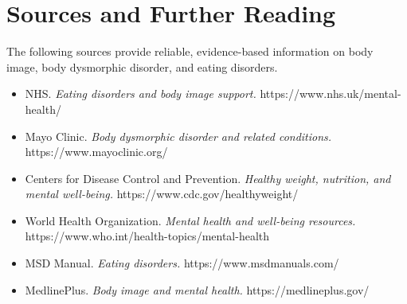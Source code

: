 \section*{Sources and Further Reading}
The following sources provide reliable, evidence-based information on body image, body dysmorphic disorder, and eating disorders.
\begin{itemize}
    \item NHS. \textit{Eating disorders and body image support.} https://www.nhs.uk/mental-health/
    \item Mayo Clinic. \textit{Body dysmorphic disorder and related conditions.} https://www.mayoclinic.org/
    \item Centers for Disease Control and Prevention. \textit{Healthy weight, nutrition, and mental well-being.} https://www.cdc.gov/healthyweight/
    \item World Health Organization. \textit{Mental health and well-being resources.} https://www.who.int/health-topics/mental-health
    \item MSD Manual. \textit{Eating disorders.} https://www.msdmanuals.com/
    \item MedlinePlus. \textit{Body image and mental health.} https://medlineplus.gov/
\end{itemize}
